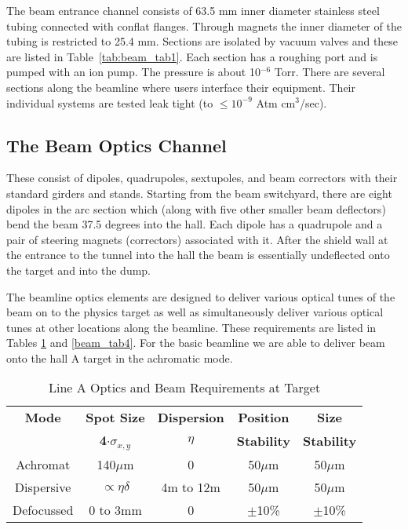 {The beam entrance channel consists of 63.5 mm inner diameter stainless steel 
tubing connected with conflat flanges. Through magnets the inner diameter of the 
tubing is restricted to 25.4 mm. Sections are isolated by vacuum valves and these are listed 
in Table~\ref{tab:beam_tab1}. Each section has a roughing port and is pumped with an ion pump. 
The pressure is about 10$^{-6}$ Torr. There are several sections along the 
beamline where users interface their equipment. Their individual systems 
are tested leak tight (to $ \le 10^{-9}$ Atm cm$^3$/sec).

\subsection{The Beam Optics Channel}

These consist of dipoles, quadrupoles, sextupoles, and 
beam correctors with their 
standard girders and stands. Starting from the beam switchyard, there are 
eight dipoles in the arc section which (along with five  other smaller beam 
deflectors) bend the beam 37.5 degrees into the hall. Each dipole has a 
quadrupole and a pair of steering magnets (correctors) associated with it. 
After the shield wall at the entrance to the tunnel into the hall the beam is 
essentially undeflected onto the target and into the dump.  

The beamline optics elements are designed to deliver 
various optical tunes of the beam on to the physics target as well as 
simultaneously deliver various optical tunes at other locations along the 
beamline. These requirements are listed in Tables \ref{beam_tab3} and \ref{beam_tab4}. 
For the basic beamline we 
are able to deliver beam onto the hall A target in the achromatic
mode. 
 
\begin{table}[hp]
\begin{center}
\begin{tabular}{|c|c|c|c|c|} \hline
{\bf Mode} & {\bf Spot Size} & {\bf Dispersion} & {\bf Position} & {\bf
Size} \\
& {\bf 4$\cdot\sigma_{x,y}$} & {\bf $\eta$} & {\bf Stability} & {\bf
Stability} \\ \hline
Achromat & 140$\mu$m & 0 & 50$\mu$m & 50$\mu$m \\ \hline
Dispersive & $\propto \eta\delta$ & 4m to 12m & 50$\mu$m & 50$\mu$m \\
\hline
Defocussed & 0 to 3mm & 0 & $\pm$10\% & $\pm$10\% \\ \hline
\end{tabular}
\end{center}
\caption[Beamline: Optics Requirements Target]{ Line A Optics and Beam Requirements at Target}
\label{beam_tab3}
\end{table}

}

